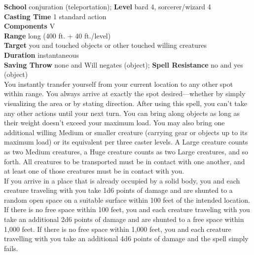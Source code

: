 \textbf{School} conjuration (teleportation); \textbf{Level} bard 4, sorcerer/wizard 4\\
\textbf{Casting Time} 1 standard action\\
\textbf{Components} V\\
\textbf{Range} long (400 ft. + 40 ft./level)\\
\textbf{Target} you and touched objects or other touched willing creatures\\
\textbf{Duration} instantaneous\\
\textbf{Saving Throw} none and Will negates (object); \textbf{Spell Resistance} no and yes (object)\\
You instantly transfer yourself from your current location to any other spot within range. You always arrive at exactly the spot desired—whether by simply visualizing the area or by stating direction. After using this spell, you can't take any other actions until your next turn. You can bring along objects as long as their weight doesn't exceed your maximum load. You may also bring one additional willing Medium or smaller creature (carrying gear or objects up to its maximum load) or its equivalent per three caster levels. A Large creature counts as two Medium creatures, a Huge creature counts as two Large creatures, and so forth. All creatures to be transported must be in contact with one another, and at least one of those creatures must be in contact with you.\\
If you arrive in a place that is already occupied by a solid body, you and each creature traveling with you take 1d6 points of damage and are shunted to a random open space on a suitable surface within 100 feet of the intended location.\\
If there is no free space within 100 feet, you and each creature traveling with you take an additional 2d6 points of damage and are shunted to a free space within 1,000 feet. If there is no free space within 1,000 feet, you and each creature travelling with you take an additional 4d6 points of damage and the spell simply fails.\\
